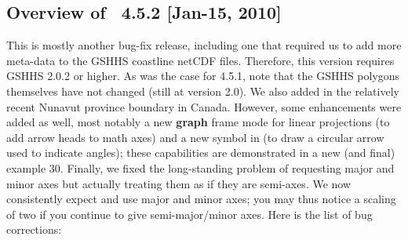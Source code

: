 \subsection{Overview of \gmt\ 4.5.2 [Jan-15, 2010]}

This is mostly another bug-fix release, including one that required us to add more meta-data
to the GSHHS coastline netCDF files.  Therefore, this version requires GSHHS 2.0.2 or higher.
As was the case for 4.5.1, note that the GSHHS polygons themselves have not changed (still at version 2.0).
We also added in the relatively recent Nunavut province boundary in Canada.
However, some enhancements were added as well, most notably a new {\bf graph} frame mode for linear
projections (to add arrow heads to math axes) and a new symbol in  (to draw a
circular arrow used to indicate angles); these capabilities are demonstrated in a new (and final) example 30.
Finally, we fixed the long-standing problem of   requesting major and minor axes but
actually treating them as if they are semi-axes.  We now consistently expect and use major and minor axes;
you may thus notice a scaling of two if you continue to give semi-major/minor axes.
Here is the list of bug corrections:
